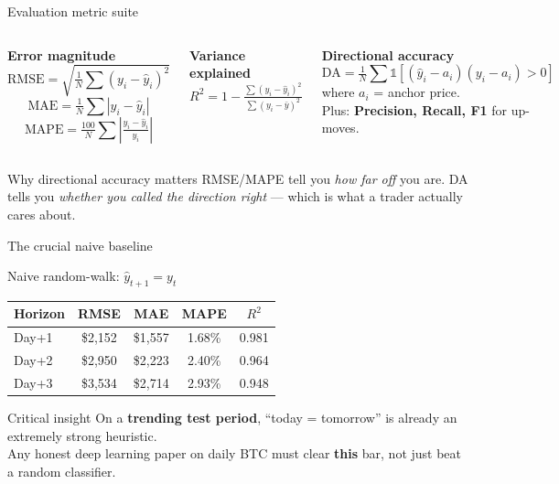 \documentclass[aspectratio=169]{beamer}
\begin{document}
\begin{frame}{Evaluation metric suite}
\begin{columns}[T,onlytextwidth]
\textbf{Error magnitude}
\begin{equation*}
\mathrm{RMSE} = \sqrt{\tfrac{1}{N}\sum (y_i - \hat{y}_i)^2}
\end{equation*}
\begin{equation*}
\mathrm{MAE} = \tfrac{1}{N}\sum |y_i - \hat{y}_i|
\end{equation*}
\begin{equation*}
\mathrm{MAPE} = \tfrac{100}{N}\sum \left|\tfrac{y_i - \hat{y}_i}{y_i}\right|
\end{equation*}

\textbf{Variance explained}
\begin{equation*}
R^2 = 1 - \tfrac{\sum (y_i - \hat{y}_i)^2}{\sum (y_i - \bar{y})^2}
\end{equation*}

\vspace{0.3cm}
\textbf{Directional accuracy}
\begin{equation*}
\mathrm{DA} = \tfrac{1}{N}\sum \mathbb{1}[(\hat{y}_i - a_i)(y_i - a_i) > 0]
\end{equation*}
where $a_i$ = anchor price.
\\[0.2cm] Plus: \textbf{Precision, Recall, F1} for up-moves.
\end{columns}

\vspace{0.3cm}
\begin{block}{Why directional accuracy matters}
RMSE/MAPE tell you \emph{how far off} you are. DA tells you \emph{whether you called the direction right} --- which is what a trader actually cares about.
\end{block}
\end{frame}

\begin{frame}{The crucial naive baseline}
\begin{block}{Naive random-walk: $\hat{y}_{t+1} = y_t$}
\centering
\footnotesize
\begin{tabular}{lcccc}
\toprule
\textbf{Horizon} & \textbf{RMSE} & \textbf{MAE} & \textbf{MAPE} & $R^2$ \\
\midrule
Day+1 & \$2{,}152 & \$1{,}557 & 1.68\% & 0.981 \\
Day+2 & \$2{,}950 & \$2{,}223 & 2.40\% & 0.964 \\
Day+3 & \$3{,}534 & \$2{,}714 & 2.93\% & 0.948 \\
\bottomrule
\end{tabular}
\end{block}

\vspace{0.3cm}
\begin{alertblock}{Critical insight}
On a \textbf{trending test period}, ``today = tomorrow'' is already an extremely strong heuristic.
\\[0.1cm] Any honest deep learning paper on daily BTC must clear \textbf{this} bar, not just beat a random classifier.
\end{alertblock}
\end{frame}
\end{document}
